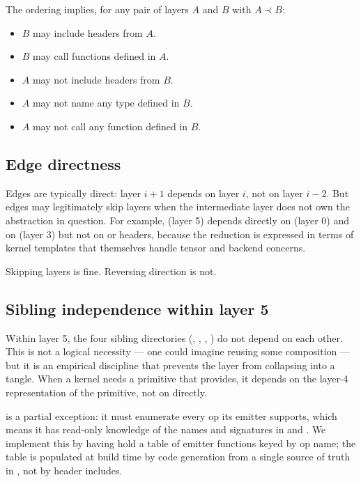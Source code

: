 The ordering implies, for any pair of layers $A$ and $B$ with
$A \prec B$:

\begin{itemize}
  \item $B$ may include headers from $A$.
  \item $B$ may call functions defined in $A$.
  \item $A$ may not include headers from $B$.
  \item $A$ may not name any type defined in $B$.
  \item $A$ may not call any function defined in $B$.
\end{itemize}

\subsection{Edge directness}
\label{ssec:layered_dag:directness}

Edges are typically direct: layer $i+1$ depends on layer $i$, not
on layer $i-2$. But edges may legitimately skip layers when the
intermediate layer does not own the abstraction in question. For
example,  (layer 5) depends directly on
 (layer 0) and on 
(layer 3) but not on  or  headers,
because the reduction is expressed in terms of kernel templates
that themselves handle tensor and backend concerns.

Skipping layers is fine. Reversing direction is not.

\subsection{Sibling independence within layer 5}
\label{ssec:layered_dag:siblings}

Within layer 5, the four sibling directories (,
, , ) do not depend on each
other. This is not a logical necessity --- one could imagine
 reusing some  composition --- but it is an
empirical discipline that prevents the layer from collapsing into
a tangle. When a  kernel needs a primitive that
 provides, it depends on the layer-4 
representation of the primitive, not on  directly.

 is a partial exception: it must enumerate every op
its emitter supports, which means it has read-only knowledge of
the names and signatures in  and . We
implement this by having  hold a table
of emitter functions keyed by op name; the table is populated at
build time by code generation from a single source of truth in
, not by header includes.

